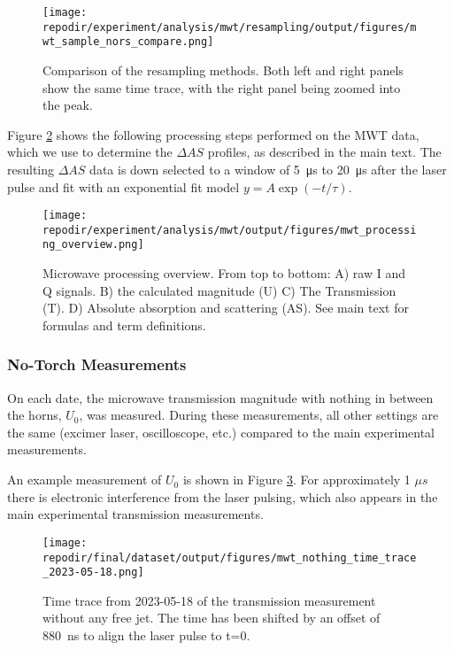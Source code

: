 \begin{figure}
\centering
\texttt{[image: \\repodir/experiment/analysis/mwt/resampling/output/figures/mwt\_sample\_nors\_compare.png]}
\caption{Comparison of the resampling methods. Both left and right panels show the same time trace, with the right panel being zoomed into the peak.}
\label{fig:SI_mwt_resampling}
\end{figure}

Figure \ref{fig:SI_mwt_processing_overview} shows the following processing steps performed on the MWT data, which we use to determine the $\Delta AS$ profiles, as described in the main text. The resulting $\Delta AS$ data is down selected to a window of \SI{5}{\micro\second} to \SI{20}{\micro\second} after the laser pulse and fit with an exponential fit model $y = A \exp(-t/\tau) $.


\begin{figure}[]
\centering
\texttt{[image: \\repodir/experiment/analysis/mwt/output/figures/mwt\_processing\_overview.png]}
\caption{Microwave processing overview. From top to bottom: A) raw I and Q signals. B) the calculated magnitude (U) C) The Transmission (T). D) Absolute absorption and scattering (AS). See main text for formulas and term definitions.  }
\label{fig:SI_mwt_processing_overview}
\end{figure}


\subsubsection{No-Torch Measurements} %
\label{sec:no_torch_measurements}

On each date, the microwave transmission magnitude with nothing in between the horns, $U_{0}$, was measured. During these measurements, all other settings are the same (excimer laser, oscilloscope, etc.) compared to the main experimental measurements.

An example measurement of $U_{0}$ is shown in Figure \ref{fig:SI_MWT_nothing_time_trace}. For approximately 1 $\mu s$ there is electronic interference from the laser pulsing, which also appears in the main experimental transmission measurements. 



\begin{figure}[]
\centering
\texttt{[image: \\repodir/final/dataset/output/figures/mwt\_nothing\_time\_trace\_2023-05-18.png]}
\caption{Time trace from 2023-05-18 of the transmission measurement without any free jet. The time has been shifted by an offset of \SI{880}{\nano\second} to align the laser pulse to t=0.}
\label{fig:SI_MWT_nothing_time_trace}
\end{figure}

